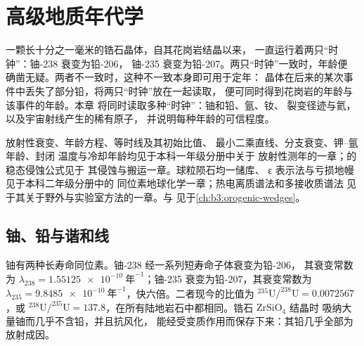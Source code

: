 \chapter{高级地质年代学}\label{ch:b3:advanced-geochronology}

一颗长十分之一毫米的锆石晶体，自其花岗岩结晶以来，
一直运行着两只“时钟”：铀-238 衰变为铅-206，
铀-235 衰变为铅-207。两只“时钟”一致时，年龄便
确凿无疑。两者不一致时，这种不一致本身即可用于定年：
晶体在后来的某次事件中丢失了部分铅，将两只“时钟”放在一起读取，
便可同时得到花岗岩的年龄与该事件的年龄。本章
将同时读取多种“时钟”：铀和铅、氩、钕、
裂变径迹与氦，以及宇宙射线产生的稀有原子，
并说明每种年龄的可信程度。

\begin{recall}
放射性衰变、年龄方程、等时线及其初始比值、
最小二乘直线、分支衰变、钾–氩年龄、封闭
温度与冷却年龄均见于本科一年级分册中关于
放射性测年的一章；的稳态侵蚀公式见于
其侵蚀与搬运一章。球粒陨石均一储库、
ε 表示法与亏损地幔见于本科二年级分册中的
同位素地球化学一章；热电离质谱法和多接收质谱法
见于其关于野外与实验室方法的一章。与
见于\cref{ch:b3:orogenic-wedges}。
\end{recall}

\section{铀、铅与谐和线}\label{sec:b3:advanced-geochronology:upb}

铀有两种长寿命同位素。铀-238 经一系列短寿命子体衰变为铅-206，
其衰变常数为 $\lambda_{238} =
\qty{1.55125e-10}{\text{年}^{-1}}$；铀-235 衰变为铅-207，其衰变常数为 $\lambda_{235}
= \qty{9.8485e-10}{\text{年}^{-1}}$，快六倍。二者现今的比值为
$^{235}\mathrm{U}/^{238}\mathrm{U} = 0.0072567$，或 $^{238}\mathrm{U}/^{235}\mathrm{U}
= 137.8$，在所有陆地岩石中都相同。锆石 $\mathrm{ZrSiO_4}$ 结晶时
吸纳大量铀而几乎不含铅，并且抗风化，
能经受变质作用而保存下来：其铅几乎全部为放射成因。

